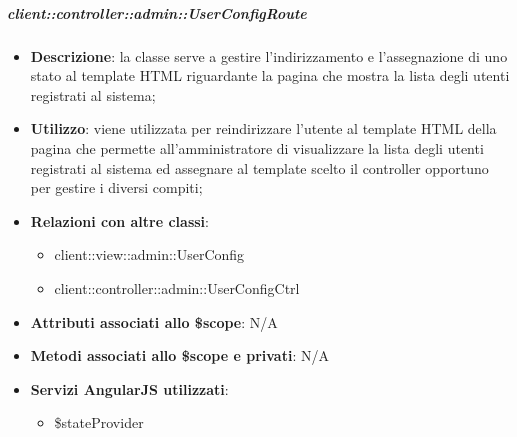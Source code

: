 
		\subparagraph{client::controller::admin::UserConfigRoute} %
		\label{subp:bdsm_app_client_controller_admin_userconfigroute}

			\begin{itemize}
				\item \textbf{Descrizione}: la classe serve a gestire l'indirizzamento e l'assegnazione di uno stato al template HTML riguardante la pagina che mostra la lista degli utenti registrati al sistema;
				\item \textbf{Utilizzo}: viene utilizzata per reindirizzare l'utente al template HTML della pagina che permette all'amministratore di visualizzare la lista degli utenti registrati al sistema ed assegnare al template scelto il controller opportuno per gestire i diversi compiti;
				\item \textbf{Relazioni con altre classi}:
					\begin{itemize}
						\item client::view::admin::UserConfig
						\item client::controller::admin::UserConfigCtrl
					\end{itemize}
				\item \textbf{Attributi associati allo \$scope}: N/A
				\item \textbf{Metodi associati allo \$scope e privati}: N/A
				\item \textbf{Servizi AngularJS utilizzati}:
					\begin{itemize}
						\item \$stateProvider
					\end{itemize}
			\end{itemize}

